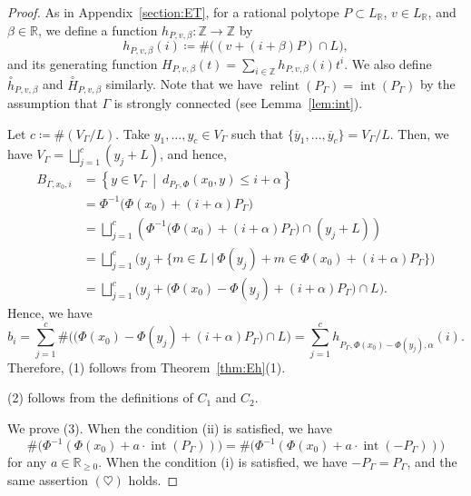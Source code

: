 \documentclass[ALCO,published]{cedram}
\theoremstyle{remark}
\begin{document}
\begin{proof}
As in Appendix~\ref{section:ET}, 
for a rational polytope $P \subset L_{\mathbb{R}}$, $v \in L_{\mathbb{R}}$, and $\beta \in \mathbb{R}$, 
we define a function $h_{P, v, \beta}: \mathbb{Z} \to \mathbb{Z}$ by
\[
h_{P,v,\beta}(i) \coloneqq  \# \bigl( (v+(i+\beta)P) \cap L \bigr), 
\]
and its generating function $H_{P,v,\beta}(t) = \sum _{i \in \mathbb{Z}} h_{P,v,\beta}(i)t^i$. 
We also define $\overset{\circ}{h}_{P,v,\beta}$ and $\overset{\circ}{H}_{P,v,\beta}$ similarly. 
Note that we have $\operatorname{relint}(P_{\Gamma}) = \operatorname{int}(P_{\Gamma})$ by the assumption that $\Gamma$ is strongly connected (see Lemma~\ref{lem:int}).


Let $c \coloneqq  \#(V_{\Gamma}/L)$. Take $y_1, \ldots, y_c \in V_{\Gamma}$ such that 
$\{ \overline{y}_1, \ldots , \overline{y}_c \} = V_{\Gamma} /L$. 
Then, we have $V_{\Gamma} = \bigsqcup _{j = 1} ^c (y_j + L)$, and hence, 
\begin{align*}
B_{\Gamma, x_0,i}
&= \left \{ y \in V_{\Gamma} \ \middle | \  d_{P_{\Gamma}, \Phi} (x_0, y) \le i + \alpha \right \} \\
&= \Phi^{-1}\bigl( \Phi (x_0) + (i + \alpha)P_{\Gamma} \bigr) \\
&= \bigsqcup _{j = 1} ^c \left( \Phi^{-1}\bigl( \Phi (x_0) + (i + \alpha)P_{\Gamma} \bigr) \cap (y_j + L) \right) \\
&= \bigsqcup _{j = 1} ^c \bigl( y_j + \bigl \{ m \in L \ \big | \ \Phi(y_j) + m \in \Phi(x_0) +  (i + \alpha)P_{\Gamma} \bigr \} \bigr) \\
&= \bigsqcup _{j = 1} ^c \bigl( y_j + \bigl( \Phi (x_0) - \Phi(y_j) + (i + \alpha) P_{\Gamma} \bigr) \cap L \bigr). 
\end{align*}
Hence, we have 
\[
b_i = \sum _{j=1}^c \# \bigl( \bigl( \Phi (x_0) - \Phi(y_j) + (i + \alpha) P_{\Gamma} \bigr) \cap L \bigr) 
= \sum _{j = 1} ^c h_{P_{\Gamma}, \Phi (x_0) - \Phi(y_j), \alpha}(i). 
\]
Therefore, (1) follows from Theorem~\ref{thm:Eh}(1). 

(2) follows from the definitions of $C_1$ and $C_2$. 

We prove (3). 
When the condition (ii) is satisfied, 
we have
\[
\# \bigl( \Phi^{-1}(\Phi(x_0) + a \cdot \operatorname{int}(P_{\Gamma})) \bigr) 
= \# \bigl( \Phi^{-1}(\Phi(x_0) + a \cdot \operatorname{int}(- P_{\Gamma})) \bigr)
\tag{$\heartsuit$}
\]
for any $a \in \mathbb{R}_{\ge 0}$. 
When the condition (i) is satisfied, we have $- P_{\Gamma} = P_{\Gamma}$, and the same assertion $(\heartsuit)$ holds. 


\end{proof}
\end{document}
